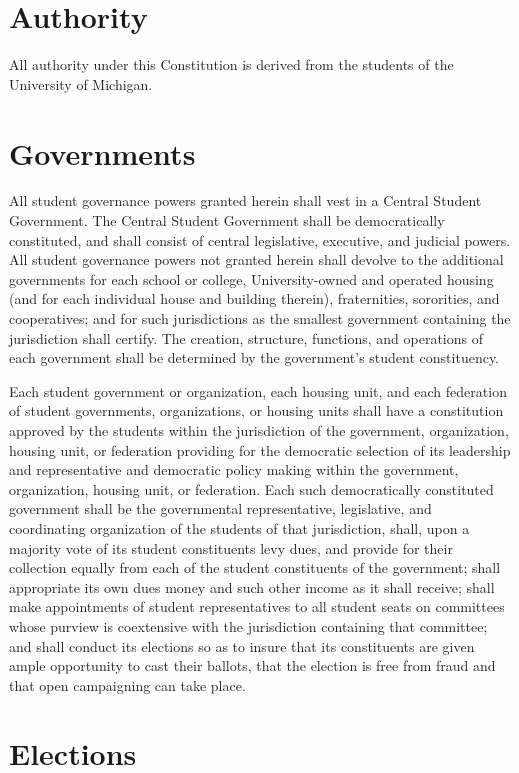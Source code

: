 
\section{Authority}
    All authority under this Constitution is derived from the students of the University of Michigan.


\section{Governments}
    All student governance powers granted herein shall vest in a Central Student Government. The Central Student Government shall be democratically constituted, and shall consist of central legislative, executive, and judicial powers. All student governance powers not granted herein shall devolve to the additional governments for each school or college, University-owned and operated housing (and for each individual house and building therein), fraternities, sororities, and cooperatives; and for such jurisdictions as the smallest government containing the jurisdiction shall certify. The creation, structure, functions, and operations of each government shall be determined by the government's student constituency.

    Each student government or organization, each housing unit, and each federation of student governments, organizations, or housing units shall have a constitution approved by the students within the jurisdiction of the government, organization, housing unit, or federation providing for the democratic selection of its leadership and representative and democratic policy making within the government, organization, housing unit, or federation. Each such democratically constituted government shall be the governmental representative, legislative, and coordinating organization of the students of that jurisdiction, shall, upon a majority vote of its student constituents levy dues, and provide for their collection equally from each of the student constituents of the government; shall appropriate its own dues money and such other income as it shall receive; shall make appointments of student representatives to all student seats on committees whose purview is coextensive with the jurisdiction containing that committee; and  shall conduct its elections so as to insure that its constituents are given ample opportunity to cast their ballots, that the election is free from fraud and that open campaigning can take place.


\section{Elections}
